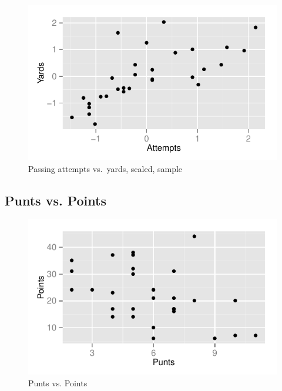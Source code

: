 \documentclass[landscape]{exam}
\begin{document}
  \begin{figure}[H]
    \centering
    \includegraphics{figures/nfl/attempts_vs_yards_scaled.pdf}
    \caption{Passing attempts vs.\ yards, scaled, sample}
  \end{figure}




  \subsection{Punts vs. Points}

  \begin{figure}[H]
    \centering
    \includegraphics{figures/nfl/punts_vs_points.pdf}
    \caption{Punts vs. Points}
  \end{figure}
\end{document}
